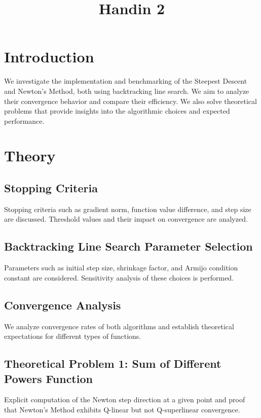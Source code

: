 \documentclass[12pt]{article}
\title{Handin 2}
\begin{document}
\maketitle

\section{Introduction}

We investigate the implementation and benchmarking of the Steepest Descent and Newton's Method, both using backtracking line search. We aim to analyze their convergence behavior and compare their efficiency.  We also solve theoretical problems that provide insights into the algorithmic choices and expected performance.



\section{Theory}

\subsection{Stopping Criteria}
Stopping criteria such as gradient norm, function value difference, and step size are discussed. Threshold values and their impact on convergence are analyzed.

\subsection{Backtracking Line Search Parameter Selection}
Parameters such as initial step size, shrinkage factor, and Armijo condition constant are considered. Sensitivity analysis of these choices is performed.

\subsection{Convergence Analysis}
We analyze convergence rates of both algorithms and establish theoretical expectations for different types of functions.

\subsection{Theoretical Problem 1: Sum of Different Powers Function}
Explicit computation of the Newton step direction at a given point and proof that Newton’s Method exhibits Q-linear but not Q-superlinear convergence.
\end{document}

